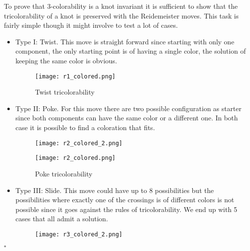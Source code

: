 \documentclass[12pt, a4paper]{article}
\newenvironment{proof}{{\sc Proof:}}{\hfill $\square$}
\begin{document}
\begin{proof}

To prove that 3-colorability is a knot invariant it is sufficient to show that the tricolorability of a knot is preserved with the Reidemeister moves. This task is fairly simple though it might involve to test a lot of cases.

\begin{itemize}
  \item Type I: Twist. This move is straight forward since starting with only one component, the only starting point is of having a single color, the solution of keeping the same color is obvious.
\begin{figure}[H]
             \centering
            \texttt{[image: r1\_colored.png]}
          \caption{Twist tricolorability}
        \label{fig:r_1_colored}
\end{figure}

\item Type II: Poke. For this move there are two possible configuration as starter since both components can have the same color or a different one. In both case it is possible to find a coloration that fits.

\begin{figure}[H]
  \begin{minipage}[c]{.5\textwidth}
             \centering
            \texttt{[image: r2\_colored\_2.png]}
    
  \end{minipage}
  \begin{minipage}[c]{.5\textwidth}
             \centering
            \texttt{[image: r2\_colored.png]}
    
  \end{minipage}
          \caption{Poke tricolorability}
        \label{fig:r_2_colored}
\end{figure}

\item Type III: Slide. This move could have up to 8 possibilities but the possibilities where exactly one of the crossings is of different colors is not possible since it goes against the rules of tricolorability. We end up with 5 cases that all admit a solution.   

\begin{figure}[H]
  \begin{minipage}[c]{.3\textwidth}
             \centering
            \texttt{[image: r3\_colored\_2.png]}
    

\end{minipage}
\end{figure}
\end{itemize}
\end{proof}
\end{document}
